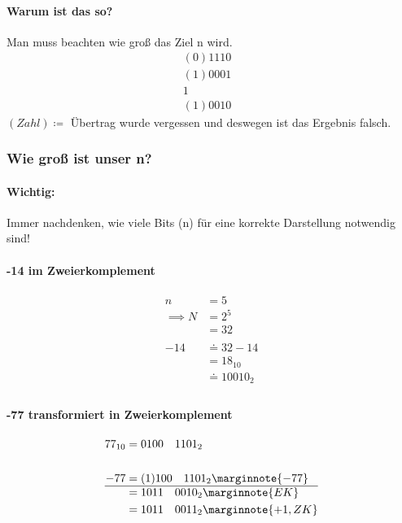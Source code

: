 \documentclass[a4paper]{scrartcl}
\begin{document}
						\paragraph{Warum ist das so?}
							Man muss beachten wie groß das Ziel n wird.\\
							\begin{align*}
								(0)1110& \\
								(1)0001&\\
								1&\\
								\hline
								(1)0010
							\end{align*}
					\((Zahl) \coloneqq \) Übertrag wurde vergessen und deswegen ist das Ergebnis falsch.\\
					\subsubsection{Wie groß ist unser n?}
						\paragraph{Wichtig:}
							Immer nachdenken, wie viele Bits (n) für eine korrekte Darstellung notwendig sind!\\
							\paragraph{-14 im Zweierkomplement}
							\begin{align*}
								n &= 5\\
								\implies N &= 2^5\\
								&= 32\\
								\\
								-14 &\doteq 32 - 14 \\
								&= 18_{10} \\
								& \doteq 10010_2\\
							\end{align*}
							
						\paragraph{-77 transformiert in Zweierkomplement}
							\begin{align*}
								77_{10} &= 0100 \quad 1101_2 \\
								\\
								-77 &= (1)100 \quad 1101_2 \marginnote{-77}\\
								\hline
								&= 1011 \quad 0010_2 \marginnote{EK}\\
								&= 1011 \quad 0011_2 \marginnote{+1, ZK}\\
							\end{align*}
					
\end{document}
